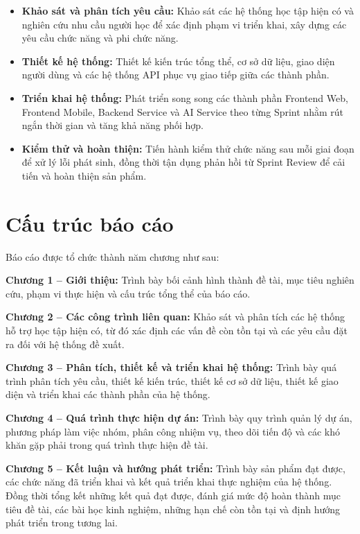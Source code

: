 \begin{itemize}
    \item \textbf{Khảo sát và phân tích yêu cầu:} Khảo sát các hệ thống học tập hiện có và nghiên cứu nhu cầu người học để xác định phạm vi triển khai, xây dựng các yêu cầu chức năng và phi chức năng.
    \item \textbf{Thiết kế hệ thống:} Thiết kế kiến trúc tổng thể, cơ sở dữ liệu, giao diện người dùng và các hệ thống API phục vụ giao tiếp giữa các thành phần.
    \item \textbf{Triển khai hệ thống:} Phát triển song song các thành phần Frontend Web, Frontend Mobile, Backend Service và AI Service theo từng Sprint nhằm rút ngắn thời gian và tăng khả năng phối hợp.
    \item \textbf{Kiểm thử và hoàn thiện:} Tiến hành kiểm thử chức năng sau mỗi giai đoạn để xử lý lỗi phát sinh, đồng thời tận dụng phản hồi từ Sprint Review để cải tiến và hoàn thiện sản phẩm.
\end{itemize}

\section{Cấu trúc báo cáo}

Báo cáo được tổ chức thành năm chương như sau:

\textbf{Chương 1 -- Giới thiệu:} Trình bày bối cảnh hình thành đề tài,
mục tiêu nghiên cứu, phạm vi thực hiện và cấu trúc tổng thể của báo cáo.

\textbf{Chương 2 -- Các công trình liên quan:} Khảo sát và phân tích các
hệ thống hỗ trợ học tập hiện có, từ đó xác định các vấn đề còn tồn tại
và các yêu cầu đặt ra đối với hệ thống đề xuất.

\textbf{Chương 3 -- Phân tích, thiết kế và triển khai hệ thống:} Trình
bày quá trình phân tích yêu cầu, thiết kế kiến trúc, thiết kế cơ sở dữ
liệu, thiết kế giao diện và triển khai các thành phần của hệ thống.

\textbf{Chương 4 -- Quá trình thực hiện dự án:} Trình bày quy trình quản
lý dự án, phương pháp làm việc nhóm, phân công nhiệm vụ, theo dõi tiến
độ và các khó khăn gặp phải trong quá trình thực hiện đề tài.

\textbf{Chương 5 -- Kết luận và hướng phát triển:} Trình bày sản phẩm đạt được, các chức năng đã triển khai và kết quả triển khai thực nghiệm của hệ thống. Đồng thời tổng kết những kết quả đạt được, đánh giá mức độ hoàn thành mục tiêu đề tài, các bài học kinh nghiệm, những hạn chế còn tồn tại và định hướng phát triển trong tương lai.